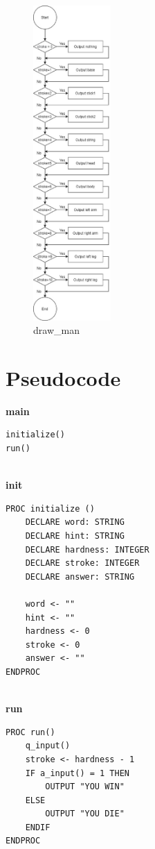 \documentclass{article}
\begin{document}
        \begin{figure}[htbp]
            \centering
            \includegraphics[height = 12cm]{flowchart/draw_man.eps}
            \caption{draw\_man}
        \end{figure}
        
    \newpage
    \section{Pseudocode}
        \textbf{main} 
        \begin{lstlisting}
initialize()
run()
        \end{lstlisting}
        \\

        \textbf{init} 
        \begin{lstlisting}
PROC initialize ()
    DECLARE word: STRING
    DECLARE hint: STRING
    DECLARE hardness: INTEGER
    DECLARE stroke: INTEGER
    DECLARE answer: STRING
    
    word <- ""
    hint <- ""
    hardness <- 0
    stroke <- 0
    answer <- ""
ENDPROC
        \end{lstlisting}
        \\

        \textbf{run}
        \begin{lstlisting}
PROC run()
    q_input()
    stroke <- hardness - 1
    IF a_input() = 1 THEN
        OUTPUT "YOU WIN"
    ELSE
        OUTPUT "YOU DIE"
    ENDIF
ENDPROC
        \end{lstlisting}
        \\
\end{document}

